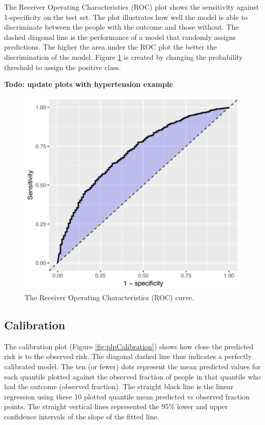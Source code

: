 \documentclass[11pt]{book}
\begin{document}
The Receiver Operating Characteristics (ROC) plot shows the sensitivity
against 1-specificity on the test set. The plot illustrates how well the
model is able to discriminate between the people with the outcome and
those without. The dashed diagonal line is the performance of a model
that randomly assigns predictions. The higher the area under the ROC
plot the better the discrimination of the model. Figure \ref{fig:roc} is
created by changing the probability threshold to assign the positive
class.

\textbf{Todo: update plots with hypertension example}

\begin{figure}

{\centering \includegraphics[width=0.8\linewidth]{images/PatientLevelPrediction/sparseROC} 

}

\caption{The Receiver Operating Characteristics (ROC) curve.}\label{fig:roc}
\end{figure}

\subsection{Calibration}\label{calibration}

The calibration plot (Figure \ref{fig:plpCalibration}) shows how close
the predicted risk is to the observed risk. The diagonal dashed line
thus indicates a perfectly calibrated model. The ten (or fewer) dots
represent the mean predicted values for each quantile plotted against
the observed fraction of people in that quantile who had the outcome
(observed fraction). The straight black line is the linear regression
using these 10 plotted quantile mean predicted vs observed fraction
points. The straight vertical lines represented the 95\% lower and upper
confidence intervals of the slope of the fitted line.
\end{document}
